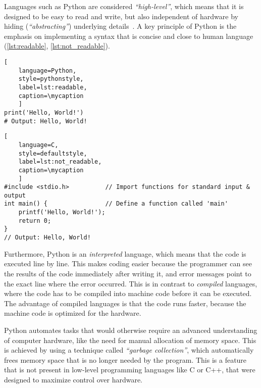 Languages such as Python are considered \textit{``high-level''}, which means
that it is designed to be easy to read and write, but also independent of
hardware by hiding (\textit{``abstracting''}) underlying
details~\cite{PythonLanguageReference2024}. A key principle of Python is the
emphasis on implementing a syntax that is concise and close to human language
(\autoref{lst:readable}, \autoref{lst:not_readable}).

\def\mycaption{ Example of
    readable Python code. This one-line code returns the words (string)
    \texttt{'Hello, World!'} when executed. The command is straightforward and easy
    to understand.}
\begin{lstlisting}[
    language=Python, 
    style=pythonstyle,
    label=lst:readable,
    caption=\mycaption
    ]
print('Hello, World!')
# Output: Hello, World!
\end{lstlisting}

\def\mycaption{ Example of less readable code written in the low-level
    programming language C. This code is doing exactly the same as the Python
    code in \autoref{lst:readable}, but is harder to understand because more
    steps are needed, including the import of a library \texttt{stdio.h} and the
    definition of a function called \texttt{main}.}
\begin{lstlisting}[
    language=C, 
    style=defaultstyle,
    label=lst:not_readable, 
    caption=\mycaption
    ]
#include <stdio.h>          // Import functions for standard input & output
int main() {                // Define a function called 'main'
    printf('Hello, World!');
    return 0;
}
// Output: Hello, World!
\end{lstlisting}

Furthermore, Python is an \textit{interpreted} language, which means that the
code is executed line by line. This makes coding easier because the programmer
can see the results of the code immediately after writing it, and error messages
point to the exact line where the error occurred. This is in contrast to
\textit{compiled} languages, where the code has to be compiled into machine code
before it can be executed. The advantage of compiled languages is that the code
runs faster, because the machine code is optimized for the hardware.

Python automates tasks that would otherwise require an advanced understanding of
computer hardware, like the need for manual allocation of memory space. This is
achieved by using a technique called \textit{``garbage collection''}, which
automatically frees memory space that is no longer needed by the program. This
is a feature that is not present in low-level programming languages like C or
C++, that were designed to maximize control over hardware.

